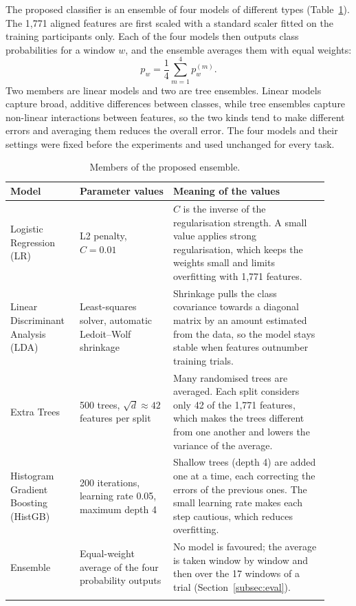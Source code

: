 \documentclass[pdflatex,sn-mathphys-num]{sn-jnl}%
\theoremstyle{thmstyleone}%
\theoremstyle{thmstyletwo}%
\theoremstyle{thmstylethree}%
\begin{document}
The proposed classifier is an ensemble of four models of different types (Table~\ref{tab:models}). The 1,771 aligned features are first scaled with a standard scaler fitted on the training participants only. Each of the four models then outputs class probabilities for a window $w$, and the ensemble averages them with equal weights:
\begin{equation}
p_w = \frac{1}{4} \sum_{m=1}^{4} p_w^{(m)} .
\end{equation}
Two members are linear models and two are tree ensembles. Linear models capture broad, additive differences between classes, while tree ensembles capture non-linear interactions between features, so the two kinds tend to make different errors and averaging them reduces the overall error. The four models and their settings were fixed before the experiments and used unchanged for every task.

\begin{table}[htbp]
\centering
\caption{Members of the proposed ensemble.}
\label{tab:models}
\footnotesize
\begin{tabular}{@{}p{0.2\linewidth}p{0.27\linewidth}p{0.45\linewidth}@{}}
\toprule
\textbf{Model} & \textbf{Parameter values} & \textbf{Meaning of the values} \\
\midrule
Logistic Regression (LR) & L2 penalty, $C = 0.01$ & $C$ is the inverse of the regularisation strength. A small value applies strong regularisation, which keeps the weights small and limits overfitting with 1,771 features. \\ \addlinespace
Linear Discriminant Analysis (LDA) & Least-squares solver, automatic Ledoit--Wolf shrinkage & Shrinkage pulls the class covariance towards a diagonal matrix by an amount estimated from the data, so the model stays stable when features outnumber training trials. \\ \addlinespace
Extra Trees & 500 trees, $\sqrt{d} \approx 42$ features per split & Many randomised trees are averaged. Each split considers only 42 of the 1,771 features, which makes the trees different from one another and lowers the variance of the average. \\ \addlinespace
Histogram Gradient Boosting (HistGB) & 200 iterations, learning rate 0.05, maximum depth 4 & Shallow trees (depth 4) are added one at a time, each correcting the errors of the previous ones. The small learning rate makes each step cautious, which reduces overfitting. \\ \addlinespace
Ensemble & Equal-weight average of the four probability outputs & No model is favoured; the average is taken window by window and then over the 17 windows of a trial (Section~\ref{subsec:eval}). \\
\botrule
\end{tabular}
\end{table}
\end{document}
